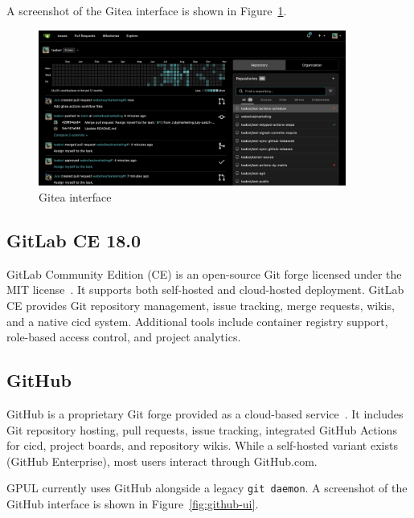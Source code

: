 A screenshot of the Gitea interface is shown in Figure~\ref{fig:gitea-ui}.

\begin{figure}[H]
  \centering
  \includegraphics[width=0.9\textwidth]{imaxes/gitea-ui.png}
  \caption{Gitea interface}
  \label{fig:gitea-ui}
\end{figure}

\subsection{GitLab CE 18.0}

GitLab Community Edition (CE) is an open-source Git forge licensed under the MIT license~\cite{gitlab-docs}. It supports both self-hosted and cloud-hosted deployment. GitLab CE provides Git repository management, issue tracking, merge requests, wikis, and a native \gls{cicd} system. Additional tools include container registry support, role-based access control, and project analytics.

\subsection{GitHub}

GitHub is a proprietary Git forge provided as a cloud-based service~\cite{github-docs}. It includes Git repository hosting, pull requests, issue tracking, integrated GitHub Actions for \gls{cicd}, project boards, and repository wikis. While a self-hosted variant exists (GitHub Enterprise), most users interact through GitHub.com.

GPUL currently uses GitHub alongside a legacy \texttt{git daemon}. A screenshot of the GitHub interface is shown in Figure~\ref{fig:github-ui}.

